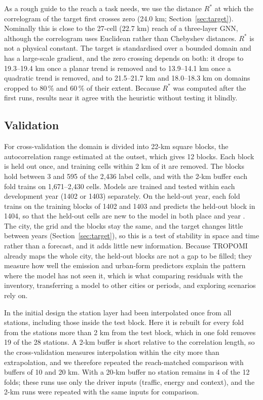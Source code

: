\documentclass[pdflatex,sn-basic]{sn-jnl}
\begin{document}
As a rough guide to the reach a task needs, we use the distance $R^{*}$ at which the correlogram of the target first crosses zero (24.0 km; Section~\ref{sec:target}). Nominally this is close to the 27-cell (22.7 km) reach of a three-layer GNN, although the correlogram uses Euclidean rather than Chebyshev distances. $R^{*}$ is not a physical constant. The target is standardised over a bounded domain and has a large-scale gradient, and the zero crossing depends on both: it drops to 19.3--19.4 km once a planar trend is removed and to 13.9--14.1 km once a quadratic trend is removed, and to 21.5--21.7 km and 18.0--18.3 km on domains cropped to 80\,\% and 60\,\% of their extent. Because $R^{*}$ was computed after the first runs, results near it agree with the heuristic without testing it blindly.

\subsection{Validation}\label{sec:validation}

For cross-validation the domain is divided into 22-km square blocks, the autocorrelation range estimated at the outset, which gives 12 blocks. Each block is held out once, and training cells within 2 km of it are removed. The blocks hold between 3 and 595 of the 2,436 label cells, and with the 2-km buffer each fold trains on 1,671--2,430 cells. Models are trained and tested within each development year (1402 or 1403) separately. On the held-out year, each fold trains on the training blocks of 1402 and 1403 and predicts the held-out block in 1404, so that the held-out cells are new to the model in both place and year \citep{meyer2018}. The city, the grid and the blocks stay the same, and the target changes little between years (Section~\ref{sec:target}), so this is a test of stability in space and time rather than a forecast, and it adds little new information. Because TROPOMI already maps the whole city, the held-out blocks are not a gap to be filled; they measure how well the emission and urban-form predictors explain the pattern where the model has not seen it, which is what comparing residuals with the inventory, transferring a model to other cities or periods, and exploring scenarios rely on.

In the initial design the station layer had been interpolated once from all stations, including those inside the test block. Here it is rebuilt for every fold from the stations more than 2 km from the test block, which in one fold removes 19 of the 28 stations. A 2-km buffer is short relative to the correlation length, so the cross-validation measures interpolation within the city more than extrapolation, and we therefore repeated the reach-matched comparison with buffers of 10 and 20 km. With a 20-km buffer no station remains in 4 of the 12 folds; these runs use only the driver inputs (traffic, energy and context), and the 2-km runs were repeated with the same inputs for comparison.
\end{document}
